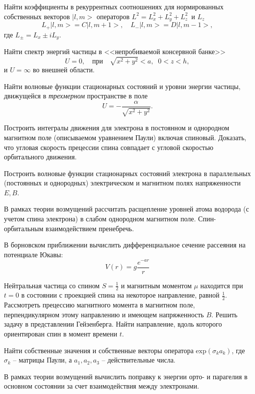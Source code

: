 \documentclass[a4paper,draft]{article}
\begin{document}
\begin{nums}{-2}
\item Найти коэффициенты в рекуррентных соотношениях для
нормированных собственных векторов $|l,m >$ операторов
$L^2=L_x^2+L_y^2+L_z^2\,$ и $ L_z$
$$
 L_+|l,m>=C |l,m+1>,\quad L_-|l,m>=D |l,m-1>,
$$
где $L_\pm=L_x\pm iL_y$. \item Найти спектр энергий частицы в
<<непробиваемой консервной банке>>
$$U=0, \quad \mbox{при} \quad \sqrt{x^2+y^2}<a,\;\; 0<z<h,$$
и $U=\infty$ во внешней области. \item Найти волновые функции
стационарных состояний и уровни энергии частицы, движущейся в {\em
трехмерном} пространстве в поле
$$U=-\frac{\alpha}{\sqrt{x^2+y^2}}.$$



\item Построить интегралы движения для электрона в постоянном и
однородном магнитном поле (описываемом уравнением Паули) включая
спиновый. Доказать, что угловая скорость прецессии спина совпадает
с угловой скоростью орбитального движения.

\item Построить
волновые функции стационарных состояний электрона в параллельных
(постоянных и однородных) электрическом и магнитном полях
напряженности $E,B$.

\item В рамках теории возмущений рассчитать
расщепление уровней атома водорода (с учетом спина электрона) в
слабом однородном магнитном поле.
Спин-орбитальным взаимодействием пренебречь.

 \item В борновском приближении
вычислить дифференциальное сечение рассеяния на потенциале Юкавы:
$$V(r)= g\frac{e^{-ar}}{r}$$

\item Нейтральная частица со спином $S=\frac{1}{2}$ и магнитным
моментом $\mu$ находится при $t=0$ в состоянии с проекцией спина
на некоторое направление, равной $ \frac{1}{2}$. Рассмотреть
прецессию магнитного момента в магнитном поле, перпендикулярном
этому направлению и имеющем напряженность $B$. Решить задачу в
представлении  Гейзенберга. Найти направление, вдоль которого
ориентирован спин в момент времени $t$.

\item Найти собственные значения и собственные  векторы оператора
$\mbox{exp}  ({ \sigma}_k  {  a}_k)  $, где $ {\sigma}_k$ --
матрицы Паули, а $ a_1 , a_2 , a_3 $ -- действительные числа.
\item В рамках теории возмущений вычислить поправку к энергии
орто- и парагелия в основном состоянии за счет взаимодействия
между электронами.


\end{nums}
\end{document}
